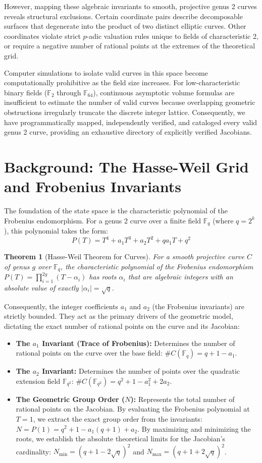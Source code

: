 \documentclass[11pt,letterpaper]{article}
\newtheorem{theorem}{Theorem}[section]
\begin{document}
However, mapping these algebraic invariants to smooth, projective genus 2 curves reveals structural exclusions. Certain coordinate pairs describe decomposable surfaces that degenerate into the product of two distinct elliptic curves. Other coordinates violate strict $p$-adic valuation rules unique to fields of characteristic 2, or require a negative number of rational points at the extremes of the theoretical grid.

Computer simulations to isolate valid curves in this space become computationally prohibitive as the field size increases. For low-characteristic binary fields ($\mathbb{F}_2$ through $\mathbb{F}_{64}$), continuous asymptotic volume formulas are insufficient to estimate the number of valid curves because overlapping geometric obstructions irregularly truncate the discrete integer lattice. Consequently, we have programmatically mapped, independently verified, and cataloged every valid genus 2 curve, providing an exhaustive directory of explicitly verified Jacobians.

\section{Background: The Hasse-Weil Grid and Frobenius Invariants}
The foundation of the state space is the characteristic polynomial of the Frobenius endomorphism. For a genus 2 curve over a finite field $\mathbb{F}_q$ (where $q = 2^k$), this polynomial takes the form:
\[ P(T) = T^4 + a_1 T^3 + a_2 T^2 + q a_1 T + q^2 \]

\begin{theorem}[Hasse-Weil Theorem for Curves]
For a smooth projective curve $C$ of genus $g$ over $\mathbb{F}_q$, the characteristic polynomial of the Frobenius endomorphism $P(T) = \prod_{i=1}^{2g} (T - \alpha_i)$ has roots $\alpha_i$ that are algebraic integers with an absolute value of exactly $|\alpha_i| = \sqrt{q}$.
\end{theorem}

Consequently, the integer coefficients $a_1$ and $a_2$ (the Frobenius invariants) are strictly bounded. They act as the primary drivers of the geometric model, dictating the exact number of rational points on the curve and its Jacobian:
\begin{itemize}
\item \textbf{The $a_1$ Invariant (Trace of Frobenius):} Determines the number of rational points on the curve over the base field: $\#C(\mathbb{F}_q) = q + 1 - a_1$.
\item \textbf{The $a_2$ Invariant:} Determines the number of points over the quadratic extension field $\mathbb{F}_{q^2}$: $\#C(\mathbb{F}_{q^2}) = q^2 + 1 - a_1^2 + 2a_2$.
\item \textbf{The Geometric Group Order ($N$):} Represents the total number of rational points on the Jacobian. By evaluating the Frobenius polynomial at $T=1$, we extract the exact group order from the invariants: $N = P(1) = q^2 + 1 - a_1(q + 1) + a_2$. By maximizing and minimizing the roots, we establish the absolute theoretical limits for the Jacobian's cardinality: $N_{\text{min}} = (q + 1 - 2\sqrt{q})^2$ and $N_{\text{max}} = (q + 1 + 2\sqrt{q})^2$.
\end{itemize}
\end{document}
